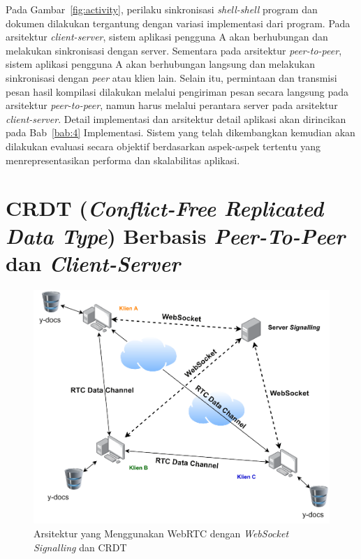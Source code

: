 Pada Gambar~\ref{fig:activity}, perilaku sinkronisasi \textit{shell-shell} program dan dokumen dilakukan tergantung dengan variasi implementasi dari program. Pada arsitektur \textit{client-server}, sistem aplikasi pengguna A akan berhubungan dan melakukan sinkronisasi dengan server. Sementara pada arsitektur \textit{peer-to-peer}, sistem aplikasi pengguna A akan berhubungan langsung dan melakukan sinkronisasi dengan \textit{peer} atau klien lain. Selain itu, permintaan dan transmisi pesan hasil kompilasi dilakukan melalui pengiriman pesan secara langsung pada arsitektur \textit{peer-to-peer}, namun harus melalui perantara server pada arsitektur \textit{client-server}. Detail implementasi dan arsitektur detail aplikasi akan dirincikan pada Bab~\ref{bab:4} Implementasi. Sistem yang telah dikembangkan kemudian akan dilakukan evaluasi secara objektif berdasarkan aspek-aspek tertentu yang menrepresentasikan performa dan skalabilitas aplikasi.

\section{CRDT (\textit{Conflict-Free Replicated Data Type}) Berbasis \textit{Peer-To-Peer} dan \textit{Client-Server}}

\begin{figure}
    \centering
    \includegraphics[scale=0.6]{assets/skripsi/Arsitektur_WebRTC_CRDT}
    \caption{Arsitektur yang Menggunakan WebRTC dengan \textit{WebSocket Signalling} dan CRDT}
\end{figure}

